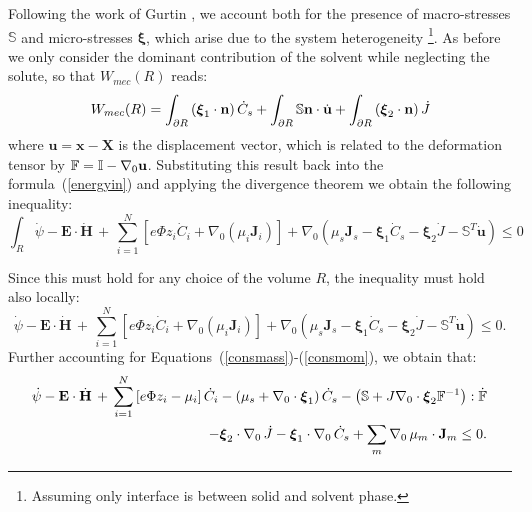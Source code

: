 Following the work of Gurtin \cite{GURTIN}, we account both for the presence of macro-stresses $\mathbb{S}$ and micro-stresses $\boldsymbol{\xi}$, which arise due to the system heterogeneity \cite{microstress}\footnote{Assuming only interface is between solid and solvent phase.}. As before we only consider the dominant contribution of the solvent while neglecting the solute, so that $W_{mec}(R)$ reads:
\begin{equation}	\centering
%	
W_{mec}(R) = \int_{\partial R} \left(\boldsymbol{\xi}_1\cdot \mathbf{n}\right)\dot{C}_s + \int_{\partial R} \mathbb{S}\mathbf{n} \cdot \dot{\mathbf{u}}+  \int_{\partial R}\left(\boldsymbol{\xi}_2\cdot \mathbf{n}\right)\dot{J}
\end{equation}
where $\mathbf{u}= \mathbf{x}-\mathbf{X}$ is the displacement vector, which is related to the deformation tensor by $\mathbb{F}=\mathbb{I}-\nabla_0 \mathbf{u}$. Substituting this result back into the formula~(\ref{energyin}) and applying the divergence theorem we obtain the following inequality:
\begin{equation}
\int_R \dot{\psi} - \mathbf{E}\cdot \dot{\mathbf{H}} \, + \, \sum\limits_{i=1}^{N} \left[e \Phi  z_i \dot{C}_i+ \nabla_0 \left(\mu_i \mathbf{J}_i \right)\right] + \nabla_0 (\mu_s \mathbf{J}_s- \boldsymbol{\xi}_1\dot{C}_s- \boldsymbol{\xi}_2\dot{J} -\mathbb{S}^T\mathbf{\dot{u}}) \leq 0 
\end{equation}

Since this must hold for any choice of the volume $R$, the inequality must hold also locally:
\begin{equation}
\dot{\psi} - \mathbf{E}\cdot \dot{\mathbf{H}} \, + \, \sum\limits_{i=1}^{N} \left[e \Phi  z_i \dot{C}_i+ \nabla_0 \left(\mu_i \mathbf{J}_i \right)\right] + \nabla_0 (\mu_s \mathbf{J}_s- \boldsymbol{\xi}_1\dot{C}_s- \boldsymbol{\xi}_2\dot{J} -\mathbb{S}^T\mathbf{\dot{u}}) \leq 0. 
\end{equation}
Further accounting for Equations~(\ref{consmass})-(\ref{consmom}), we obtain that:
\begin{equation}
\begin{aligned}
\dot{\psi} - \mathbf{E}\cdot \dot{\mathbf{H}} \, + \, \sum\limits_{i=1}^{N} \left[e \Phi  z_i - \mu_i\right] \dot{C}_i - (\mu_s + \nabla_0 \cdot \boldsymbol{\xi}_1)\,\dot{C}_s -\left(\mathbb{S} +J\nabla_0 \cdot \boldsymbol{\xi}_2\mathbb{F}^{-1}\right):\dot{\mathbb{F}}\\
-\boldsymbol{\xi}_2 \cdot \nabla_0 \, \dot{J}-\boldsymbol{\xi}_1 \cdot \nabla_0 \, \dot{C}_s + \sum\limits_{m} \nabla_0 \, \mu_m \cdot \mathbf{J}_m \leq 0.
\label{temp2}
\end{aligned} 
\end{equation}

